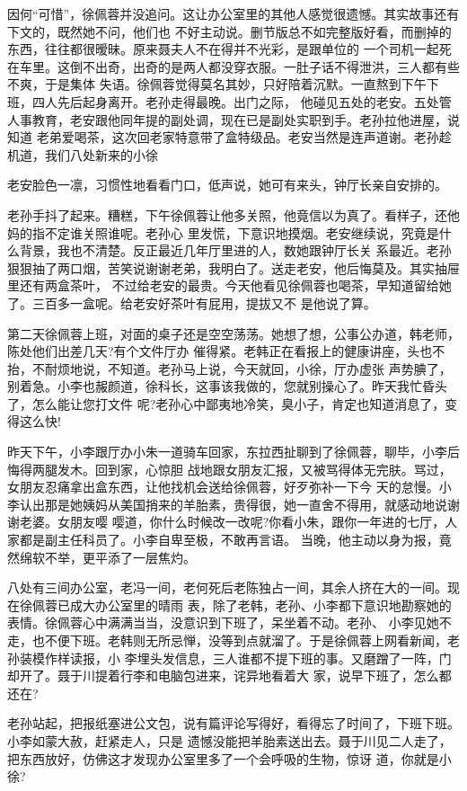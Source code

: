 \documentclass[11pt,a4paper,onecolumn]{article}
\begin{document}
因何“可惜”，徐佩蓉并没追问。这让办公室里的其他人感觉很遗憾。其实故事还有下文的，既然她不问，他们也
不好主动说。删节版总不如完整版好看，而删掉的东西，往往都很暧昧。原来聂夫人不在得并不光彩，是跟单位的
一个司机一起死在车里。这倒不出奇，出奇的是两人都没穿衣服。一肚子话不得泄洪，三人都有些不爽，于是集体
失语。徐佩蓉觉得莫名其妙，只好陪着沉默。一直熬到下午下班，四人先后起身离开。老孙走得最晚。出门之际，
他碰见五处的老安。五处管人事教育，老安跟他同年提的副处调，现在已是副处实职到手。老孙拉他进屋，说知道
老弟爱喝茶，这次回老家特意带了盒特级品。老安当然是连声道谢。老孙趁机道，我们八处新来的小徐\myrule{}

老安脸色一凛，习惯性地看看门口，低声说，她可有来头，钟厅长亲自安排的。

老孙手抖了起来。糟糕，下午徐佩蓉让他多关照，他竟信以为真了。看样子，还他妈的指不定谁关照谁呢。老孙心
里发慌，下意识地摸烟。老安继续说，究竟是什么背景，我也不清楚。反正最近几年厅里进的人，数她跟钟厅长关
系最近。老孙狠狠抽了两口烟，苦笑说谢谢老弟，我明白了。送走老安，他后悔莫及。其实抽屉里还有两盒茶叶，
不过给老安的最贵。今天他看见徐佩蓉也喝茶，早知道留给她了。三百多一盒呢。给老安好茶叶有屁用，提拔又不
是他说了算。

第二天徐佩蓉上班，对面的桌子还是空空荡荡。她想了想，公事公办道，韩老师，陈处他们出差几天?有个文件厅办
催得紧。老韩正在看报上的健康讲座，头也不抬，不耐烦地说，不知道。老孙马上说，今天就回，小徐，厅办虚张
声势腆了，别着急。小李也赧颜道，徐科长，这事该我做的，您就别操心了。昨天我忙昏头了，怎么能让您打文件
呢?老孙心中鄙夷地冷笑，臭小子，肯定也知道消息了，变得这么快!

昨天下午，小李跟厅办小朱一道骑车回家，东拉西扯聊到了徐佩蓉，聊毕，小李后悔得两腿发木。回到家，心惊胆
战地跟女朋友汇报，又被骂得体无完肤。骂过，女朋友忍痛拿出盒东西，让他找机会送给徐佩蓉，好歹弥补一下今
天的怠慢。小李认出那是她姨妈从美国捎来的羊胎素，贵得很，她一直舍不得用，就感动地说谢谢老婆。女朋友嘤
嘤道，你什么时候改一改呢?你看小朱，跟你一年进的七厅，人家都是副主任科员了。小李自卑至极，不敢再言语。
当晚，他主动以身为报，竟然绵软不举，更平添了一层焦灼。

八处有三间办公室，老冯一间，老何死后老陈独占一间，其余人挤在大的一间。现在徐佩蓉已成大办公室里的晴雨
表，除了老韩，老孙、小李都下意识地勘察她的表情。徐佩蓉心中满满当当，没意识到下班了，呆坐着不动。老孙、
小李见她不走，也不便下班。老韩则无所忌惮，没等到点就溜了。于是徐佩蓉上网看新闻，老孙装模作样读报，小
李埋头发信息，三人谁都不提下班的事。又磨蹭了一阵，门却开了。聂于川提着行李和电脑包进来，诧异地看着大
家，说早下班了，怎么都还在?

老孙站起，把报纸塞进公文包，说有篇评论写得好，看得忘了时间了，下班下班。小李如蒙大赦，赶紧走人，只是
遗憾没能把羊胎素送出去。聂于川见二人走了，把东西放好，仿佛这才发现办公室里多了一个会呼吸的生物，惊讶
道，你就是小徐?
\end{document}
